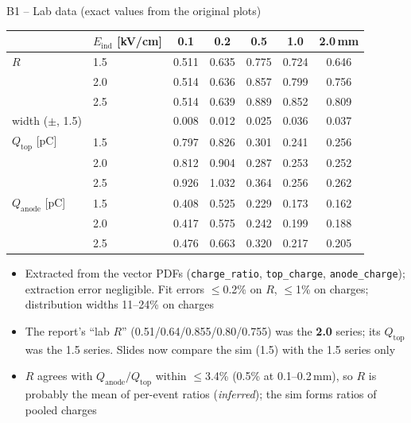 \documentclass[aspectratio=169,11pt]{beamer}
\newcommand{\backlink}[1]{\hfill\hyperlink{#1}{\beamerreturnbutton{back}}}
\newcommand{\Qtop}{Q_\text{top}}
\newcommand{\Eind}{E_\text{ind}}
\begin{document}
\begin{frame}[label=b-data]{B1 -- Lab data (exact values from the original plots)}
  \centering\scriptsize\renewcommand{\arraystretch}{0.92}
  \begin{tabular}{llccccc}\toprule
    & $\Eind$ [kV/cm] & 0.1 & 0.2 & 0.5 & 1.0 & 2.0\,mm\\\midrule
    $R$ & 1.5 & 0.511 & 0.635 & 0.775 & 0.724 & 0.646\\
        & 2.0 & 0.514 & 0.636 & 0.857 & 0.799 & 0.756\\
        & 2.5 & 0.514 & 0.639 & 0.889 & 0.852 & 0.809\\
    \quad width ($\pm$, 1.5) & & 0.008 & 0.012 & 0.025 & 0.036 & 0.037\\\midrule
    $\Qtop$ [pC] & 1.5 & 0.797 & 0.826 & 0.301 & 0.241 & 0.256\\
        & 2.0 & 0.812 & 0.904 & 0.287 & 0.253 & 0.252\\
        & 2.5 & 0.926 & 1.032 & 0.364 & 0.256 & 0.262\\\midrule
    $Q_\text{anode}$ [pC] & 1.5 & 0.408 & 0.525 & 0.229 & 0.173 & 0.162\\
        & 2.0 & 0.417 & 0.575 & 0.242 & 0.199 & 0.188\\
        & 2.5 & 0.476 & 0.663 & 0.320 & 0.217 & 0.205\\\bottomrule
  \end{tabular}
  \raggedright
  \begin{itemize}\footnotesize\setlength{\itemsep}{0pt}
    \item Extracted from the vector PDFs (\texttt{charge\_ratio}, \texttt{top\_charge}, \texttt{anode\_charge}); extraction error negligible. Fit errors $\le$0.2\% on $R$, $\le$1\% on charges; distribution widths 11--24\% on charges
    \item The report's ``lab $R$'' (0.51/0.64/0.855/0.80/0.755) was the \textbf{2.0} series; its $\Qtop$ was the 1.5 series. Slides now compare the sim (1.5) with the 1.5 series only
    \item $R$ agrees with $Q_\text{anode}/\Qtop$ within $\le$3.4\% (0.5\% at 0.1--0.2\,mm), so $R$ is probably the mean of per-event ratios (\emph{inferred}); the sim forms ratios of pooled charges
  \end{itemize}
  \backlink{m-obs}
\end{frame}
\end{document}
